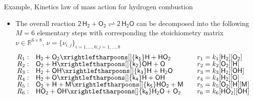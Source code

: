 %
%
\begin{frame}{Example, Kinetics law of mass action for hydrogen combustion}
		\begin{itemize}
		\item The overall reaction $\mathsf{2 \, H_2 + O_2 \rightleftharpoons 2\, H_2O}$ can be 
		decomposed into the following $M=6$ elementary steps with corresponding 
		the stoichiometry matrix $\nu \in \mathbb{R}^{6 \times 8}$, $\nu = \{\nu_{i, j}\}_{i = 1, ...,6; j = 1, ..., 8}$
			\lcol
			{\scriptsize
			\begin{alignat*}{4}
				R_1:  & \quad \mathsf{H_2 + O_2 \xrightleftharpoons[]{k_1} H + HO_2}    & \quad & r_1 = k_1  \mathsf{[H_2][O_2] } \\[-5pt]
				R_2: & \quad \mathsf{O_2 + H \xrightleftharpoons[]{k_2} OH + O}           && r_2 = k_2  \mathsf{[O_2][H] } \\[-5pt]
				R_3: & \quad \mathsf{H_2 + OH \xrightleftharpoons[]{k_3} H + H_2O}     && r_3 = k_3  \mathsf{[H_2][OH] } \\[-5pt]
				R_4: & \quad \mathsf{H_2 + O \xrightleftharpoons[]{k_4} H + OH}           && r_4 = k_4  \mathsf{[H_2][O] } \\[-5pt]
				R_5: & \quad \mathsf{O_2 + H + M \xrightleftharpoons[]{k_5} HO_2 + M} && r_5 = k_5  \mathsf{[O_2][H][M] } \\[-5pt]
				R_6: & \quad \mathsf{HO_2 + OH \xrightleftharpoons[]{k_6} H_2O + O_2} && r_6 = k_6  \mathsf{[HO_2][OH] }
			\end{alignat*}
			}
			\rcol
			{\small
				\vskip -30pt
			}
\end{itemize}
\end{frame}
